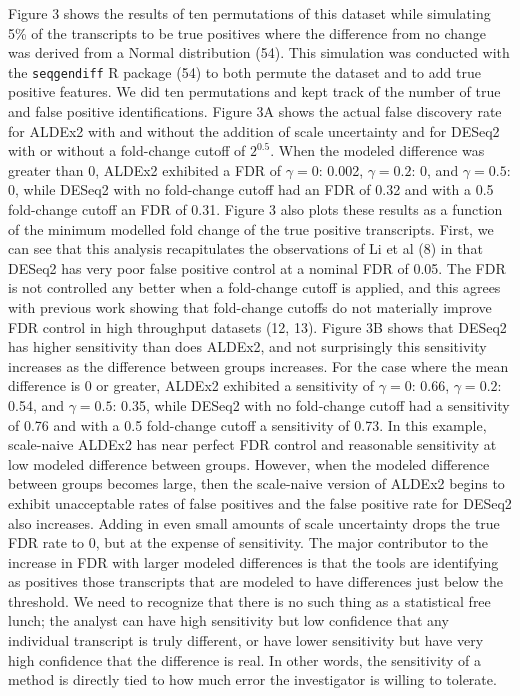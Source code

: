 \documentclass[
]{article}
\begin{document}
Figure 3 shows the results of ten permutations of this dataset while
simulating 5\% of the transcripts to be true positives where the
difference from no change was derived from a Normal distribution (54).
This simulation was conducted with the \texttt{seqgendiff} R package
(54) to both permute the dataset and to add true positive features. We
did ten permutations and kept track of the number of true and false
positive identifications. Figure 3A shows the actual false discovery
rate for ALDEx2 with and without the addition of scale uncertainty and
for DESeq2 with or without a fold-change cutoff of \(2^{0.5}\). When the
modeled difference was greater than 0, ALDEx2 exhibited a FDR of
\(\gamma = 0\): 0.002, \(\gamma = 0.2\): 0, and \(\gamma = 0.5\): 0,
while DESeq2 with no fold-change cutoff had an FDR of 0.32 and with a
0.5 fold-change cutoff an FDR of 0.31. Figure 3 also plots these results
as a function of the minimum modelled fold change of the true positive
transcripts. First, we can see that this analysis recapitulates the
observations of Li et al (8) in that DESeq2 has very poor false positive
control at a nominal FDR of 0.05. The FDR is not controlled any better
when a fold-change cutoff is applied, and this agrees with previous work
showing that fold-change cutoffs do not materially improve FDR control
in high throughput datasets (12, 13). Figure 3B shows that DESeq2 has
higher sensitivity than does ALDEx2, and not surprisingly this
sensitivity increases as the difference between groups increases. For
the case where the mean difference is 0 or greater, ALDEx2 exhibited a
sensitivity of \(\gamma = 0\): 0.66, \(\gamma = 0.2\): 0.54, and
\(\gamma = 0.5\): 0.35, while DESeq2 with no fold-change cutoff had a
sensitivity of 0.76 and with a 0.5 fold-change cutoff a sensitivity of
0.73. In this example, scale-naive ALDEx2 has near perfect FDR control
and reasonable sensitivity at low modeled difference between groups.
However, when the modeled difference between groups becomes large, then
the scale-naive version of ALDEx2 begins to exhibit unacceptable rates
of false positives and the false positive rate for DESeq2 also
increases. Adding in even small amounts of scale uncertainty drops the
true FDR rate to 0, but at the expense of sensitivity. The major
contributor to the increase in FDR with larger modeled differences is
that the tools are identifying as positives those transcripts that are
modeled to have differences just below the threshold. We need to
recognize that there is no such thing as a statistical free lunch; the
analyst can have high sensitivity but low confidence that any individual
transcript is truly different, or have lower sensitivity but have very
high confidence that the difference is real. In other words, the
sensitivity of a method is directly tied to how much error the
investigator is willing to tolerate.
\end{document}
